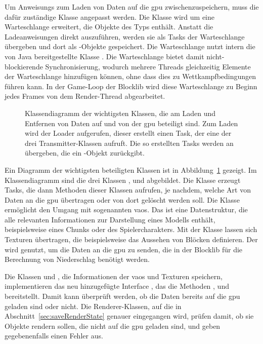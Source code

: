 Um \glspl{Anweisung} zum Laden von Daten auf die \ac{gpu} zwischenzuspeichern, muss die dafür zuständige Klasse  angepasst werden. Die Klasse wird um eine Warteschlange erweitert, die Objekte des Typs  enthält. Anstatt die Ladeanweisungen direkt auszuführen, werden sie als Tasks der Warteschlange übergeben und dort als -Objekte gespeichert. Die Warteschlange nutzt intern die von Java bereitgestellte Klasse . Die Warteschlange bietet damit nicht-blockierende Synchronisierung, wodurch mehrere Threads gleichzeitig Elemente der Warteschlange hinzufügen können, ohne dass dies zu Wettkampfbedingungen führen kann. In der Game-Loop der Blocklib wird diese Warteschlange zu Beginn jedes Frames von dem Render-Thread abgearbeitet.

\begin{figure}
	\centering
	
	\caption[Klassendiagramm der wichtigsten Klassen, die am Laden und Entfernen von Daten auf und von der  beteiligt sind.]{Klassendiagramm der wichtigsten Klassen, die am Laden und Entfernen von Daten auf und von der \ac{gpu} beteiligt sind. Zum Laden wird der Loader aufgerufen, dieser erstellt einen Task, der eine der drei Transmitter-Klassen aufruft. Die so erstellten Tasks werden an  übergeben, die ein -Objekt zurückgibt.}\label{fig:loaderDiagram}
\end{figure}
Ein Diagramm der wichtigsten beteiligten Klassen ist in Abbildung~\ref{fig:loaderDiagram} gezeigt. Im Klassendiagramm sind die drei Klassen ,  und  abgebildet. Die Klasse  erzeugt Tasks, die dann Methoden dieser Klassen aufrufen, je nachdem, welche Art von Daten an die \ac{gpu} übertragen oder von dort gelöscht werden soll. Die Klasse  ermöglicht den Umgang mit sogenannten \acp{vao}. Das ist eine Datenstruktur, die alle relevanten Informationen zur Darstellung eines Modells enthält, beispielsweise eines Chunks oder des Spielercharakters. Mit der Klasse  lassen sich Texturen übertragen, die beispielsweise das Aussehen von Blöcken definieren. Der  wird genutzt, um die Daten an die \ac{gpu} zu senden, die in der Blocklib für die Berechnung von Niederschlag benötigt werden.

Die Klassen  und , die Informationen der \acp{vao} und Texturen speichern, implementieren das neu hinzugefügte Interface , das die Methoden 	, 
 und 
 bereitstellt. Damit kann überprüft werden, ob die Daten bereits auf die \ac{gpu} geladen sind oder nicht. Die Renderer-Klassen, auf die in Abschnitt~\ref{sec:saveRenderState} genauer eingegangen wird, prüfen damit, ob sie Objekte rendern sollen, die nicht auf die \ac{gpu} geladen sind, und geben gegebenenfalls einen Fehler aus.

